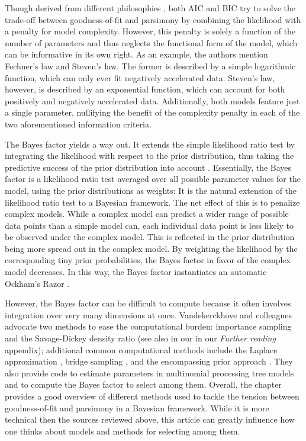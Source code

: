 Though derived from different philosophies \cite<for an overview, see>{aho2014model}, both AIC and BIC try to solve the trade-off between goodness-of-fit and parsimony by combining the likelihood with a penalty for model complexity. However, this penalty is solely a function of the number of parameters and thus neglects the functional form of the model, which can be informative in its own right. As an example, the authors mention Fechner's law and Steven's law. The former is described by a simple logarithmic function, which can only ever fit negatively accelerated data. Steven's law, however, is described by an exponential function, which can account for both positively and negatively accelerated data. Additionally, both models feature just a single parameter, nullifying the benefit of the complexity penalty in each of the two aforementioned information criteria.

The Bayes factor yields a way out. It extends the simple likelihood ratio test by integrating the likelihood with respect to the prior distribution, thus taking the predictive success of the prior distribution into account \cite<see also>[in the \emph{Further Reading} appendix]{Gallistel2009}.
Essentially, the Bayes factor is a likelihood ratio test averaged over all possible parameter values for the model, using the prior distributions as weights: It is the natural extension of the likelihood ratio test to a Bayesian framework. 
The net effect of this is to penalize complex models.  While a complex model can predict a wider range of possible data points than a simple model can, each individual data point is less likely to be observed under the complex model. This is reflected in the prior distribution being more spread out in the complex model.  By weighting the likelihood by the corresponding tiny prior probabilities, the Bayes factor in favor of the complex model decreases. In this way, the Bayes factor instantiates an automatic Ockham's Razor \cite<see also>[in the appended \textit{Further Reading} section]{myung1997}.

However, the Bayes factor can be difficult to compute because it often involves integration over very many dimensions at once.  Vandekerckhove and colleagues \citeyear{vandekerckhove2015model} advocate two methods to ease the computational burden: importance sampling and the Savage-Dickey density ratio (see also  in our in our \textit{Further reading} appendix); additional common computational methods include the Laplace approximation \cite{KassRaftery1995}, bridge sampling \cite{Meng1996bridge,Gronau2017Bridge}, and the encompassing prior approach \cite{hoijtink2008}. They also provide code to estimate parameters in multinomial processing tree models and to compute the Bayes factor to select among them. Overall, the chapter provides a good overview of different methods used to tackle the tension between goodness-of-fit and parsimony in a Bayesian framework. While it is more technical then the sources reviewed above, this article can greatly influence how one thinks about models and methods for selecting among them.

